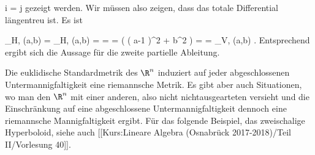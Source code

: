 {\mavergleichskette
{\vergleichskette
{ i
}
{ = }{ j
}
{  }{
}
{    }{
}
{   }{
}
}
{}{}{}
gezeigt werden. Wir müssen also zeigen, dass das totale Differential längentreu ist. Es ist

\mavergleichskettealigndrucklinks
{\vergleichskettealigndrucklinks
{  \Vert_{H, \psi(a,b) }
}
{ =} {  \Vert_{H, \psi(a,b) }
}
{ =} { {  }  \Vert
}
{ =} { {  } 
}
{ =} { {  } \left(  \left(  a-1  \right)^2 + b^2   \right)
}
}
{
\vergleichskettefortsetzungalign
{ =} { {  }
}
{ =} {  \Vert_{V, (a,b)}
}
{ } {}
{ } {}
}{}{.}
Entsprechend ergibt sich die Aussage für die zweite partielle Ableitung.

}

Die euklidische Standardmetrik des $\R^n$ induziert auf jeder abgeschlossenen Untermannigfaltigkeit eine riemannsche Metrik. Es gibt aber auch Situationen, wo man den $\R^n$ mit einer anderen, also nicht
nichtausgearteten
versieht und die Einschränkung auf eine abgeschlossene Untermannigfaltigkeit dennoch eine riemannsche Mannigfaltigkeit ergibt. Für das folgende Beispiel, das zweischalige Hyperboloid, siehe auch [[Kurs:Lineare Algebra (Osnabrück 2017-2018)/Teil II/Vorlesung 40]].

